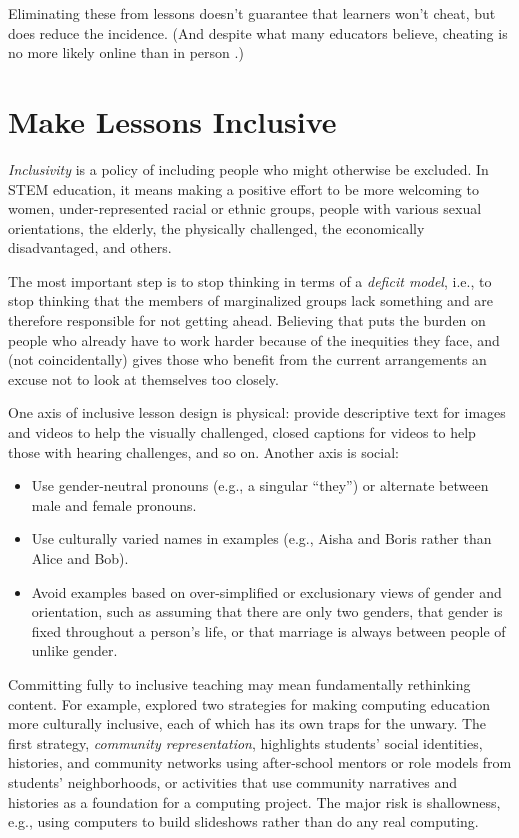 \documentclass[10pt,letterpaper]{article}
\newcommand{\rulemajor}[1]{\section{#1}}
\begin{document}
Eliminating these from lessons doesn't guarantee that learners won't cheat, but
does reduce the incidence.  (And despite what many educators believe, cheating
is no more likely online than in person \cite{Beck2014}.)

\rulemajor{Make Lessons Inclusive}

\emph{Inclusivity} is a policy of including people who might otherwise be
excluded.  In STEM education, it means making a positive effort to be more
welcoming to women, under-represented racial or ethnic groups, people with
various sexual orientations, the elderly, the physically challenged, the
economically disadvantaged, and others.

The most important step is to stop thinking in terms of a \emph{deficit model},
i.e., to stop thinking that the members of marginalized groups lack something
and are therefore responsible for not getting ahead. Believing that puts the
burden on people who already have to work harder because of the inequities they
face, and (not coincidentally) gives those who benefit from the current
arrangements an excuse not to look at themselves too closely.

One axis of inclusive lesson design is physical: provide descriptive text for
images and videos to help the visually challenged, closed captions for videos to
help those with hearing challenges, and so on.  Another axis is social:

\begin{itemize}

\item Use gender-neutral pronouns (e.g., a singular ``they'') or alternate
  between male and female pronouns.

\item Use culturally varied names in examples (e.g., Aisha and Boris rather than
  Alice and Bob).

\item Avoid examples based on over-simplified or exclusionary views of gender
  and orientation, such as assuming that there are only two genders, that gender
  is fixed throughout a person's life, or that marriage is always between people
  of unlike gender.

\end{itemize}

Committing fully to inclusive teaching may mean fundamentally rethinking
content.  For example, \cite{Lach2018} explored two strategies for making
computing education more culturally inclusive, each of which has its own traps
for the unwary.  The first strategy, \emph{community representation}, highlights
students' social identities, histories, and community networks using
after-school mentors or role models from students' neighborhoods, or activities
that use community narratives and histories as a foundation for a computing
project.  The major risk is shallowness, e.g., using computers to build
slideshows rather than do any real computing.
\end{document}
